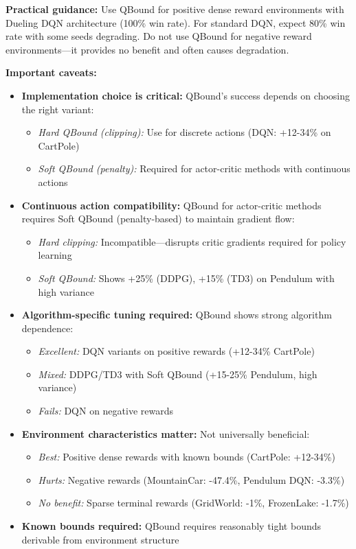 \documentclass[11pt]{article}
\theoremstyle{definition}
\theoremstyle{remark}
\begin{document}
\textbf{Practical guidance:} Use QBound for positive dense reward environments with Dueling DQN architecture (100\% win rate). For standard DQN, expect 80\% win rate with some seeds degrading. Do not use QBound for negative reward environments---it provides no benefit and often causes degradation.

\textbf{Important caveats:}
\begin{itemize}
    \item \textbf{Implementation choice is critical:} QBound's success depends on choosing the right variant:
        \begin{itemize}
            \item \textit{Hard QBound (clipping):} Use for discrete actions (DQN: +12-34\% on CartPole)
            \item \textit{Soft QBound (penalty):} Required for actor-critic methods with continuous actions
        \end{itemize}

    \item \textbf{Continuous action compatibility:} QBound for actor-critic methods requires Soft QBound (penalty-based) to maintain gradient flow:
        \begin{itemize}
            \item \textit{Hard clipping:} Incompatible—disrupts critic gradients required for policy learning
            \item \textit{Soft QBound:} Shows +25\% (DDPG), +15\% (TD3) on Pendulum with high variance
        \end{itemize}

    \item \textbf{Algorithm-specific tuning required:} QBound shows strong algorithm dependence:
        \begin{itemize}
            \item \textit{Excellent:} DQN variants on positive rewards (+12-34\% CartPole)
            \item \textit{Mixed:} DDPG/TD3 with Soft QBound (+15-25\% Pendulum, high variance)
            \item \textit{Fails:} DQN on negative rewards
        \end{itemize}

    \item \textbf{Environment characteristics matter:} Not universally beneficial:
        \begin{itemize}
            \item \textit{Best:} Positive dense rewards with known bounds (CartPole: +12-34\%)
            \item \textit{Hurts:} Negative rewards (MountainCar: -47.4\%, Pendulum DQN: -3.3\%)
            \item \textit{No benefit:} Sparse terminal rewards (GridWorld: -1\%, FrozenLake: -1.7\%)
        \end{itemize}

    \item \textbf{Known bounds required:} QBound requires reasonably tight bounds derivable from environment structure
\end{itemize}
\end{document}
